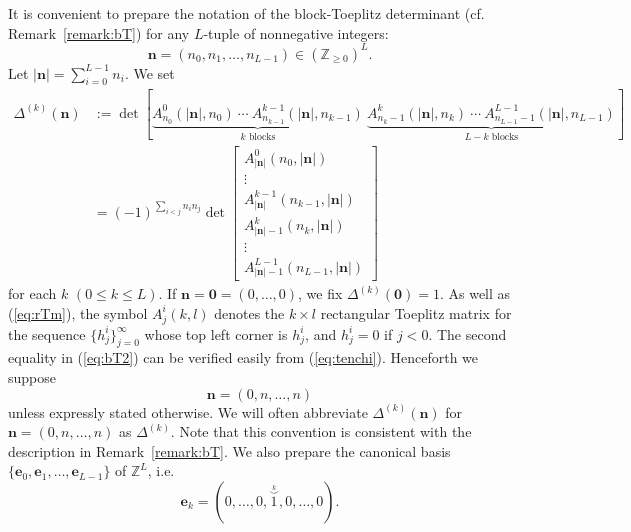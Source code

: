 \documentclass[12pt]{article}
\numberwithin{equation}{section}
\begin{document}
It is convenient to prepare the notation of the block-Toeplitz determinant
(cf. Remark~\ref{remark:bT})
for any $L$-tuple of nonnegative integers:
\[
{\boldsymbol n}=(n_0,n_1,\ldots,n_{L-1}) \in ({\mathbb Z}_{\geq 0})^L.
\]
Let $| {\boldsymbol n}|=\sum_{i=0}^{L-1} n_i$.
We set
\begin{align}
\Delta^{(k)}
({\boldsymbol n})
&:=
 \det
 \left[
\underbrace{
A^0_{n_0}(  | {\boldsymbol n} |,  n_0) \
\cdots  \
A^{k-1}_{n_{k-1}}(| {\boldsymbol n} |,  n_{k-1})}_{\text{$k$ blocks}}
 \
\underbrace{
A^{k}_{n_k-1}(| {\boldsymbol n} |,  n_k)  \
\cdots   \  
A^{L-1}_{n_{L-1}-1}(| {\boldsymbol n} |,  n_{L-1})
}_{\text{$L-k$ blocks}}
\right]
\nonumber
\\
&=
(-1)^{\sum_{i<j} n_in_j}
\det 
\begin{bmatrix}
A^0_{ | {\boldsymbol n} | }(n_0,| {\boldsymbol n} |) 
\\
\vdots
\\
A^{k-1}_{| {\boldsymbol n} |}(n_{k-1},| {\boldsymbol n} |)
\\ 
A^{k}_{| {\boldsymbol n} |-1}(n_k,| {\boldsymbol n} |)
\\ 
\vdots \\
A^{L-1}_{| {\boldsymbol n} |-1}(n_{L-1},| {\boldsymbol n} |) 
\end{bmatrix}
\label{eq:bT2}
\end{align}
for each $k$ $(0 \leq k \leq L)$.
If ${\boldsymbol n}={\boldsymbol 0}=(0,\ldots,0)$,
we fix
$\Delta^{(k)}({\boldsymbol 0})=1$.
As well as (\ref{eq:rTm}),
the symbol $A^i_j( k, l) $
denotes the
$ k \times  l$
 rectangular Toeplitz matrix 
 for the sequence
$\{h^i_j\}_{j=0}^\infty$
whose top left corner is $h^i_{j}$,
and
$h^i_j=0$ if $j<0$.
The second equality in (\ref{eq:bT2})
can be verified easily from
(\ref{eq:tenchi}). 
Henceforth
we suppose  
\[{\boldsymbol n}=(0,n, \ldots ,n)
\]
unless expressly stated otherwise.
We will often abbreviate
$\Delta^{(k)}({\boldsymbol n})$ for 
${\boldsymbol n}=(0,n, \ldots ,n)$
as $\Delta^{(k)}$.
Note that this convention is consistent with 
the description in
Remark~\ref{remark:bT}.
We also prepare the canonical basis 
$\{ {\boldsymbol e}_0,{\boldsymbol e}_1, \ldots, {\boldsymbol e}_{L-1} \}$ 
of ${\mathbb Z}^{L}$,
i.e. 
\[
{\boldsymbol e}_k=(0, \ldots,0,
\stackrel{ \stackrel{k}{\smile} }{1},0,\ldots,0).
\]
\end{document}
